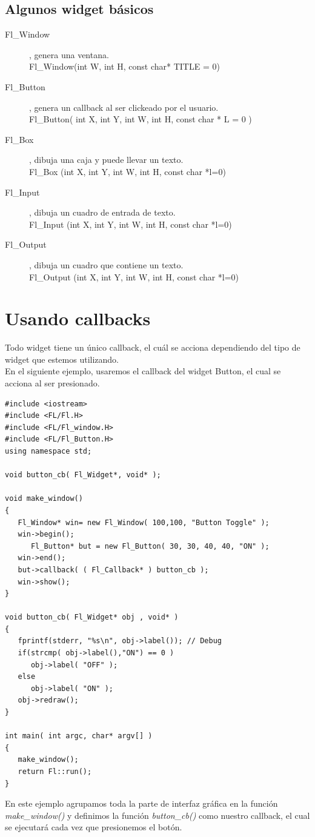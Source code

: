 \documentclass[10pt, oneside]{article}   	%
\begin{document}
\subsection{Algunos widget básicos}
\begin{description}
\item[Fl\_Window], genera una ventana.\\ Fl\_Window(int W, int H, const char* TITLE = 0)
\item[Fl\_Button], genera un callback al ser clickeado por el usuario. \\Fl\_Button( int  X, int  Y, int  W, int  H, const char *  L = 0 ) 
\item[Fl\_Box], dibuja una caja y puede llevar un texto.\\Fl\_Box (int X, int Y, int W, int H, const char *l=0)
\item[Fl\_Input], dibuja un cuadro de entrada de texto.\\Fl\_Input (int X, int Y, int W, int H, const char *l=0)
\item[Fl\_Output], dibuja un cuadro que contiene un texto.\\Fl\_Output (int X, int Y, int W, int H, const char *l=0)
\end{description}

\section{Usando callbacks}
Todo widget tiene un único callback, el cuál se acciona dependiendo del tipo de widget que estemos utilizando. \\En el siguiente ejemplo, usaremos el callback del widget Button, el cual se acciona al ser presionado.
\begin{lstlisting}
#include <iostream>
#include <FL/Fl.H>
#include <FL/Fl_window.H>
#include <FL/Fl_Button.H>
using namespace std;

void button_cb( Fl_Widget*, void* );  

void make_window()
{
   Fl_Window* win= new Fl_Window( 100,100, "Button Toggle" );
   win->begin();  
      Fl_Button* but = new Fl_Button( 30, 30, 40, 40, "ON" );
   win->end();
   but->callback( ( Fl_Callback* ) button_cb );
   win->show();
}

void button_cb( Fl_Widget* obj , void* )
{
   fprintf(stderr, "%s\n", obj->label()); // Debug
   if(strcmp( obj->label(),"ON") == 0 )
      obj->label( "OFF" ); 
   else
      obj->label( "ON" );
   obj->redraw();
}

int main( int argc, char* argv[] )
{
   make_window();
   return Fl::run();
}
\end{lstlisting}
En este ejemplo agrupamos toda la parte de interfaz gráfica en la función \textit{make\_window()} y definimos la función \textit{button\_cb()} como nuestro callback, el cual se ejecutará cada vez que presionemos el botón.
\end{document}
